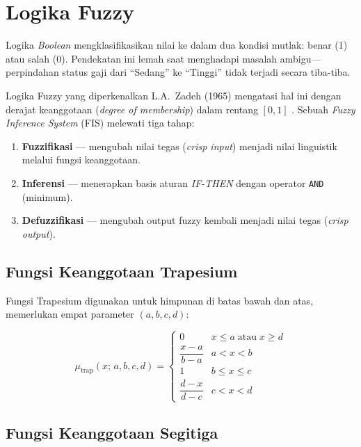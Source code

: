 \documentclass[12pt,a4paper]{report}
\begin{document}
\section{Logika Fuzzy}

Logika \textit{Boolean} mengklasifikasikan nilai ke dalam dua
kondisi mutlak: benar (1) atau salah (0). Pendekatan ini lemah
saat menghadapi masalah ambigu—perpindahan status gaji dari
``Sedang'' ke ``Tinggi'' tidak terjadi secara tiba-tiba.

Logika Fuzzy yang diperkenalkan L.A.\ Zadeh (1965) mengatasi
hal ini dengan derajat keanggotaan (\textit{degree of
membership}) dalam rentang $[0, 1]$ \cite{zadeh1988}. Sebuah
\textit{Fuzzy Inference System} (FIS) melewati tiga tahap:

\begin{enumerate}[label=\arabic*.]
  \item \textbf{Fuzzifikasi} — mengubah nilai tegas
        (\textit{crisp input}) menjadi nilai linguistik melalui
        fungsi keanggotaan.
  \item \textbf{Inferensi} — menerapkan basis aturan
        \textit{IF-THEN} dengan operator \texttt{AND} (minimum).
  \item \textbf{Defuzzifikasi} — mengubah output fuzzy kembali
        menjadi nilai tegas (\textit{crisp output}).
\end{enumerate}

\subsection{Fungsi Keanggotaan Trapesium}

Fungsi Trapesium digunakan untuk himpunan di batas bawah dan
atas, memerlukan empat parameter $(a, b, c, d)$:

\begin{equation}
  \mu_{\mathrm{trap}}(x;\,a,b,c,d) =
  \begin{cases}
    0                        & x \le a \;\text{atau}\; x \ge d \\[4pt]
    \dfrac{x-a}{b-a}         & a < x < b \\[6pt]
    1                        & b \le x \le c \\[6pt]
    \dfrac{d-x}{d-c}         & c < x < d
  \end{cases}
  \label{eq:trapesium}
\end{equation}

\subsection{Fungsi Keanggotaan Segitiga}
\end{document}
